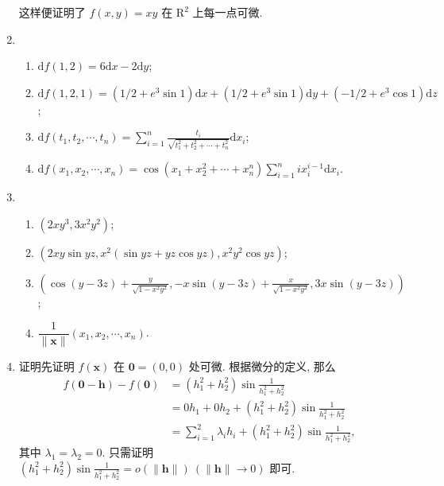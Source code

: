 \documentclass[a4paper, 11pt]{ctexart}
\newcommand{\diff}{\mathrm{d}}
\begin{document}
\begin{enumerate}
\[        \]
        这样便证明了 $f(x, y) = xy$ 在 $\mathrm{R}^2$ 上每一点可微.
    \item %
        \begin{enumerate}[(1)]
            \item %
                $\diff{f(1, 2)} = 6\diff{x} - 2\diff{y}$;
            \item %
                $\diff{f(1, 2, 1)} = (1/2 + e^3\sin1)\diff x + (1/2 + e^3\sin1)\diff y + (-1/2 + e^3\cos1)\diff z$;
            \item %
                $\diff f(t_1, t_2, \cdots, t_n) = \displaystyle{\sum_{i=1}^n}\frac{t_i}{\sqrt{t_1^2 + t_2^2 + \cdots + t_n^2}}\diff x_i$;
            \item %
                $\diff f(x_1, x_2, \cdots, x_n) = \cos(x_1 + x_2^2 + \cdots + x_n^n)\displaystyle{\sum_{i=1}^nix_i^{i-1}\diff x_i}$.
        \end{enumerate}
    \item %
        \begin{enumerate}[(1)]
            \item %
                $(2xy^3, 3x^2y^2)$;
            \item %
                $(2xy\sin{yz}, x^2(\sin{yz}+yz\cos{yz}), x^2y^2\cos{yz})$;
            \item %
                $\displaystyle{
                    \left(
                        \cos(y-3z) + \frac{y}{\sqrt{1-x^2y^2}}, -x\sin(y-3z) + \frac{x}{\sqrt{1-x^2y^2}}, 3x\sin(y-3z)    
                    \right)
                }$;
            \item %
                $\dfrac{1}{\|\boldsymbol{x}\|}(x_1, x_2, \cdots, x_n)$.
        \end{enumerate}
    \item %
        {\heiti 证明}\quad 先证明 $f(\boldsymbol{x})$ 在 $\boldsymbol{0} = (0,0)$ 处可微. 根据微分的定义, 那么
        \begin{align*}
            f(\boldsymbol{0} - \boldsymbol{h}) - f(\boldsymbol{0}) &= (h_1^2 + h_2^2)\sin\frac{1}{h_1^2 + h_2^2} \\
            &= 0h_1 + 0h_2 + (h_1^2 + h_2^2)\sin\frac{1}{h_1^2 + h_2^2} \\
            &= \sum_{i=1}^2\lambda_ih_i + (h_1^2 + h_2^2)\sin\frac{1}{h_1^2 + h_2^2},   
        \end{align*}
        其中 $\lambda_1 = \lambda_2 = 0$. 只需证明 $(h_1^2 + h_2^2)\sin\frac{1}{h_1^2 + h_2^2} = o(\|\boldsymbol{h}\|)\ (\|\boldsymbol{h}\|\to0)$ 即可.

\end{enumerate}
\end{document}
